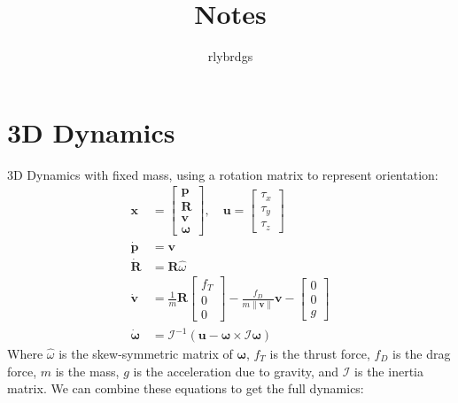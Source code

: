 \documentclass[11pt]{article}
\title{Notes}
\author{rlybrdgs }
\begin{document}
\maketitle
\section{3D Dynamics}
3D Dynamics with fixed mass, using a rotation matrix to represent orientation:
\begin{align*}
    \mathbf{x} &= \begin{bmatrix}
        \mathbf{p} \\ \mathbf{R} \\ \mathbf{v} \\ \mathbf{\omega}
    \end{bmatrix}, \quad
    \mathbf{u} = \begin{bmatrix}
        \tau_x \\ \tau_y \\ \tau_z
    \end{bmatrix} \\
    \dot{\mathbf{p}} &= \mathbf{v} \\
    \dot{\mathbf{R}} &= \mathbf{R} \hat{\omega} \\
    \dot{\mathbf{v}} &= \frac{1}{m} \mathbf{R} \begin{bmatrix}
        f_T \\ 0 \\ 0
    \end{bmatrix} - \frac{f_D}{m\|\mathbf{v}\|} \mathbf{v} - \begin{bmatrix}
        0 \\ 0 \\ g
    \end{bmatrix} \\
    \dot{\mathbf{\omega}} &= \mathcal{I}^{-1} \left( \mathbf{u} - \mathbf{\omega} \times \mathcal{I} \mathbf{\omega} \right)
\end{align*}
Where $\hat{\omega}$ is the skew-symmetric matrix of $\mathbf{\omega}$, $f_T$ is the thrust force, $f_D$ is the drag force, $m$ is the mass, $g$ is the acceleration due to gravity, and $\mathcal{I}$ is the inertia matrix. We can combine these equations to get the full dynamics:
\end{document}

